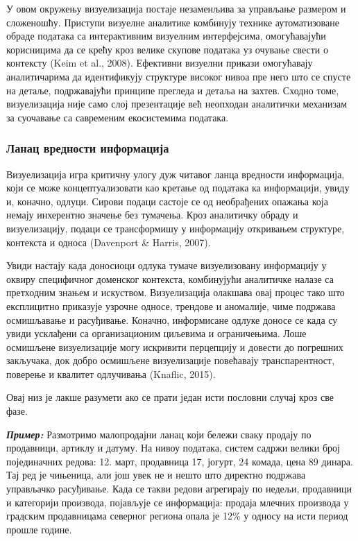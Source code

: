 У овом окружењу визуелизација постаје незаменљива за управљање размером и сложеношћу. Приступи визуелне аналитике комбинују технике аутоматизоване обраде података са интерактивним визуелним интерфејсима, омогућавајући корисницима да се крећу кроз велике скупове података уз очување свести о контексту (Keim et al., 2008). Ефективни визуелни прикази омогућавају аналитичарима да идентификују структуре високог нивоа пре него што се спусте на детаље, подржавајући принципе прегледа и детаља на захтев. Сходно томе, визуелизација није само слој презентације већ неопходан аналитички механизам за суочавање са савременим екосистемима података.

\subsubsection{Ланац вредности информација}
Визуелизација игра критичну улогу дуж читавог ланца вредности информација, који се може концептуализовати као кретање од података ка информацији, увиду и, коначно, одлуци. Сирови подаци састоје се од необрађених опажања која немају инхерентно значење без тумачења. Кроз аналитичку обраду и визуелизацију, подаци се трансформишу у информацију откривањем структуре, контекста и односа (Davenport \& Harris, 2007).

Увиди настају када доносиоци одлука тумаче визуелизовану информацију у оквиру специфичног доменског контекста, комбинујући аналитичке налазе са претходним знањем и искуством. Визуелизација олакшава овај процес тако што експлицитно приказује узрочне односе, трендове и аномалије, чиме подржава осмишљавање и расуђивање. Коначно, информисане одлуке доносе се када су увиди усклађени са организационим циљевима и ограничењима. Лоше осмишљене визуелизације могу искривити перцепцију и довести до погрешних закључака, док добро осмишљене визуелизације повећавају транспарентност, поверење и квалитет одлучивања (Knaflic, 2015).

Овај низ је лакше разумети ако се прати један исти пословни случај кроз све фазе. 

\textbf{\textit{Пример:}} Размотримо малопродајни ланац који бележи сваку продају по продавници, артиклу и датуму. На нивоу података, систем садржи велики број појединачних редова: 12. март, продавница 17, јогурт, 24 комада, цена 89 динара. Тај ред је чињеница, али још увек не и нешто што директно подржава управљачко расуђивање. Када се такви редови агрегирају по недељи, продавници и категорији производа, појављује се информација: продаја млечних производа у градским продавницама северног региона опала је 12\% у односу на исти период прошле године.


